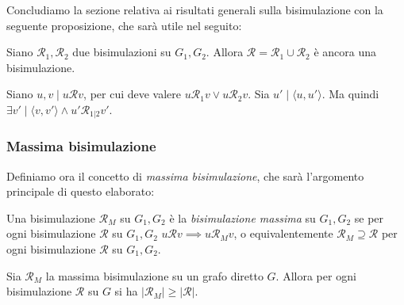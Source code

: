 Concludiamo la sezione relativa ai risultati generali sulla bisimulazione con la seguente proposizione, che sarà utile nel seguito:
\begin{proposition}
    Siano $\mathcal{R}_1, \mathcal{R}_2$ due bisimulazioni su $G_1, G_2$. Allora $\mathcal{R} = \mathcal{R}_1 \cup \mathcal{R}_2$ è ancora una bisimulazione.
    \label{obs:bisimulation_union}
\end{proposition}
\begin{proof2}
    Siano $u,v \mid u \mathcal{R} v$, per cui deve valere $u \mathcal{R}_1 v \lor u \mathcal{R}_2 v$. Sia $u' \mid \langle u, u' \rangle$. Ma quindi $\exists v' \mid \langle v,v' \rangle \land u' \mathcal{R}_{1|2} v'$.
\end{proof2}

\subsubsection{Massima bisimulazione}
\label{sec:bisi_max}
Definiamo ora il concetto di \emph{massima bisimulazione}, che sarà l'argomento principale di questo elaborato:
\begin{definition}
    Una bisimulazione $\mathcal{R}_M$ su $G_1, G_2$ è la \emph{bisimulazione massima} su $G_1, G_2$ se per ogni bisimulazione $\mathcal{R}$ su $G_1,G_2 \,\, u \mathcal{R} v \implies u \mathcal{R}_M v$, o equivalentemente $\mathcal{R}_M \supseteq \mathcal{R}$ per ogni bisimulazione $\mathcal{R}$ su $G_1, G_2$.
\end{definition}

\begin{observation}
    Sia $\mathcal{R}_M$ la massima bisimulazione su un grafo diretto $G$. Allora per ogni bisimulazione $\mathcal{R}$ su $G$ si ha $|\mathcal{R}_M| \geq |\mathcal{R}|$.
\end{observation}

